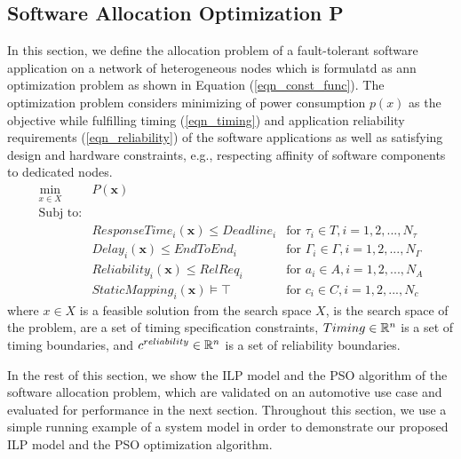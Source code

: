 \subsection{Software Allocation Optimization P}\label{sec_allocation}
In this section, we define the allocation problem of a fault-tolerant software application on a network of heterogeneous nodes which is formulatd as ann optimization problem as shown in Equation (\ref{eqn_const_func}). The optimization problem considers minimizing of power consumption $p(x)$ as the objective while fulfilling timing (\ref{eqn_timing}) and application reliability requirements (\ref{eqn_reliability}) of the software applications as well as satisfying design and hardware constraints, e.g., respecting affinity of software components to dedicated nodes.
\begin{align}
\label{eqn_optimization}
\min_{x\in X}\;\;& P(\textbf{x}) & \\
\text{Subj to:} &\\
& ResponseTime_i(\textbf{x}) \leq Deadline_i & \text{for }\tau_i\in T, i=1,2,...,N_\tau \\ 
\label{eqn_e2e}
&Delay_i(\textbf{x}) \leq EndToEnd_i & \text{for }\Gamma_i\in \Gamma, i=1,2,...,N_\Gamma \\
\label{eqn_reliability}
&Reliability_i(\textbf{x}) \leq RelReq_i & \text{for }a_i\in A, i=1,2,...,N_A\\
\label{eqn_mapping}
&StaticMapping_i(\textbf{x})\models \top & \text{for }c_i\in C, i=1,2,...,N_c
\end{align}
where $x\in X$ is a feasible solution from the search space
$X$, is the search space of the problem,  are a set of timing specification constraints, $Timing\in \Bbb R^n$ is a set of timing boundaries, and $c^{reliability}\in \Bbb R^n$ is a set of reliability boundaries.

In the rest of this section, we show the ILP model and the PSO algorithm of the software allocation problem, which are validated on an automotive use case and evaluated for performance in the next section. Throughout this section, we use a simple running example of a system model in order to demonstrate our proposed ILP model and the PSO optimization algorithm.

